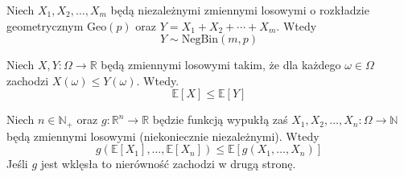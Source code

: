 \begin{fact}\label{F:sum_of_geo_RV}
Niech $X_1, X_2, \dots, X_m$ będą niezależnymi zmiennymi losowymi o rozkładzie geometrycznym $\mathrm{Geo}(p)$ oraz $Y=X_1 + X_2 + \cdots + X_m$. Wtedy 
\[
    Y \sim \mathrm{NegBin}(m, p)
\]
\end{fact}


\begin{fact}\label{F:montonicity_of_expectation}
Niech $X,Y:\Omega\to\mathbb{R}$ będą zmiennymi losowymi takim, że dla każdego $\omega\in\Omega$ zachodzi $X(\omega)\le Y(\omega)$. Wtedy. 
\[
    \mathbb{E}[X] \le \mathbb{E}[Y]
\]
\end{fact}

\begin{fact}\label{F:Jensen} 
Niech $n\in\mathbb{N}_+$ oraz $g:\mathbb{R}^n\to\mathbb{R}$ będzie funkcją wypukłą zaś $X_1,X_2,\dots, X_n:\Omega\to\mathbb{N}$ będą zmiennymi losowymi (niekoniecznie niezależnymi). Wtedy
\[
    g(\mathbb{E}[X_1],\dots, \mathbb{E}[X_n]) \le \mathbb{E}[g(X_1,\dots,X_n)]
\]
Jeśli $g$ jest wklęsła to nierówność zachodzi w drugą stronę.
\end{fact}